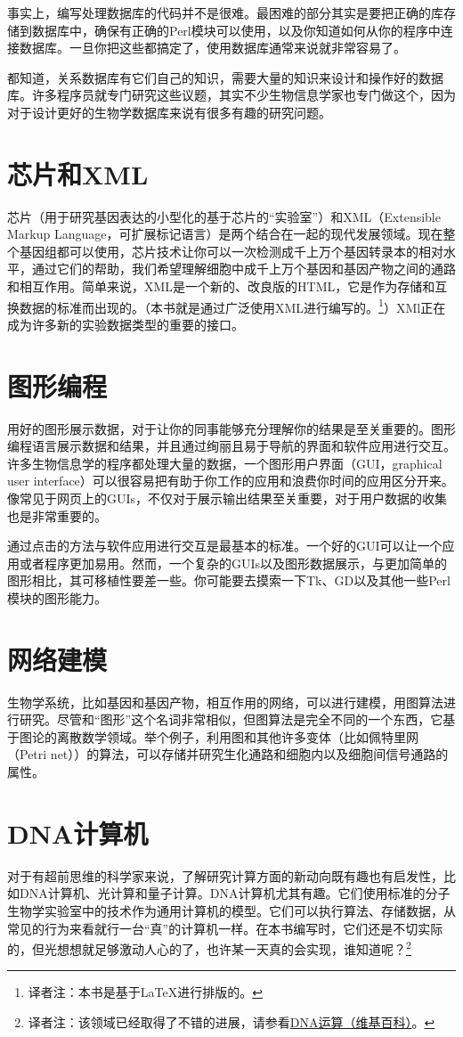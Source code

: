 事实上，编写处理数据库的代码并不是很难。最困难的部分其实是要把正确的库存储到数据库中，确保有正确的Perl模块可以使用，以及你知道如何从你的程序中连接数据库。一旦你把这些都搞定了，使用数据库通常来说就非常容易了。

都知道，关系数据库有它们自己的知识，需要大量的知识来设计和操作好的数据库。许多程序员就专门研究这些议题，其实不少生物信息学家也专门做这个，因为对于设计更好的生物学数据库来说有很多有趣的研究问题。

\section{芯片和XML}
芯片（用于研究基因表达的小型化的基于芯片的“实验室”）和XML（Extensible Markup Language，可扩展标记语言）是两个结合在一起的现代发展领域。现在整个基因组都可以使用，芯片技术让你可以一次检测成千上万个基因转录本的相对水平，通过它们的帮助，我们希望理解细胞中成千上万个基因和基因产物之间的通路和相互作用。简单来说，XML是一个新的、改良版的HTML，它是作为存储和互换数据的标准而出现的。（本书就是通过广泛使用XML进行编写的。\footnote{译者注：本书是基于\LaTeX 进行排版的。}）XMl正在成为许多新的实验数据类型的重要的接口。

\section{图形编程}
用好的图形展示数据，对于让你的同事能够充分理解你的结果是至关重要的。图形编程语言展示数据和结果，并且通过绚丽且易于导航的界面和软件应用进行交互。许多生物信息学的程序都处理大量的数据，一个图形用户界面（GUI，graphical user interface）可以很容易把有助于你工作的应用和浪费你时间的应用区分开来。像常见于网页上的GUIs，不仅对于展示输出结果至关重要，对于用户数据的收集也是非常重要的。

通过点击的方法与软件应用进行交互是最基本的标准。一个好的GUI可以让一个应用或者程序更加易用。然而，一个复杂的GUIs以及图形数据展示，与更加简单的图形相比，其可移植性要差一些。你可能要去摸索一下Tk、GD以及其他一些Perl模块的图形能力。

\section{网络建模}
生物学系统，比如基因和基因产物，相互作用的网络，可以进行建模，用图算法进行研究。尽管和“图形”这个名词非常相似，但图算法是完全不同的一个东西，它基于图论的离散数学领域。举个例子，利用图和其他许多变体（比如佩特里网（Petri net））的算法，可以存储并研究生化通路和细胞内以及细胞间信号通路的属性。

\section{DNA计算机}
对于有超前思维的科学家来说，了解研究计算方面的新动向既有趣也有启发性，比如DNA计算机、光计算和量子计算。DNA计算机尤其有趣。它们使用标准的分子生物学实验室中的技术作为通用计算机的模型。它们可以执行算法、存储数据，从常见的行为来看就行一台“真”的计算机一样。在本书编写时，它们还是不切实际的，但光想想就足够激动人心的了，也许某一天真的会实现，谁知道呢？\footnote{译者注：该领域已经取得了不错的进展，请参看\href{https://zh.wikipedia.org/wiki/DNA\%E9\%81\%8B\%E7\%AE\%97}{DNA运算（维基百科）}。}
